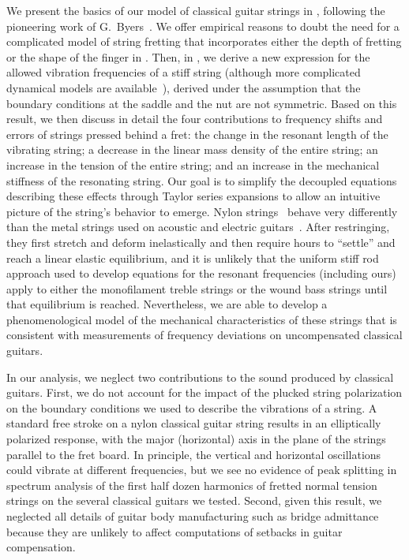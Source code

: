 We present the basics of our model of classical guitar strings in , following the pioneering work of G.\ Byers~\cite{ref:byersgal,ref:byers1996cgi,ref:byersweb}. We offer empirical reasons to doubt the need for a complicated model of string fretting that incorporates either the depth of fretting or the shape of the finger in . Then, in , we derive a new expression for the allowed vibration frequencies of a stiff string (although more complicated dynamical models are available~\cite{ref:ducceschi2016lss}), derived  under the assumption that the boundary conditions at the saddle and the nut are not symmetric. Based on this result, we then discuss in detail the four contributions to frequency shifts and errors of strings pressed behind a fret: the change in the resonant length of the vibrating string; a decrease in the linear mass density of the entire string; an increase in the tension of the entire string; and an increase in the mechanical stiffness of the resonating string. Our goal is to simplify the decoupled equations describing these effects through Taylor series expansions to allow an intuitive picture of the string's behavior to emerge. Nylon strings~\cite{ref:blanc1996nvb,ref:lynchaird2017mpn,ref:lynchaird2018cmp} behave very differently than the metal strings used on acoustic and electric guitars~\cite{ref:grimes2014stp,ref:kemp2017puw,ref:kemp2020ibg}. After restringing, they first stretch and deform inelastically and then require hours to ``settle'' and reach a linear elastic equilibrium, and it is unlikely that the uniform stiff rod approach used to develop equations for the resonant frequencies (including ours) apply to either the monofilament treble strings or the wound bass strings until that equilibrium is reached. Nevertheless, we are able to develop a phenomenological model of the mechanical characteristics of these strings that is consistent with measurements of frequency deviations on uncompensated classical guitars.

In our analysis, we neglect two contributions to the sound produced by classical guitars. First, we do not account for the impact of the plucked string polarization on the boundary conditions we used to describe the vibrations of a string. A standard free stroke on a nylon classical guitar string results in an elliptically polarized response, with the major (horizontal) axis in the plane of the strings parallel to the fret board. In principle, the vertical and horizontal oscillations could vibrate at different frequencies, but we see no evidence of peak splitting in spectrum analysis of the first half dozen harmonics of fretted normal tension strings on the several classical guitars we tested. Second, given this result, we neglected all details of guitar body manufacturing such as bridge admittance~\cite{ref:woodland2004pgt,ref:torres2009ibv} because they are unlikely to affect computations of setbacks in guitar compensation.

